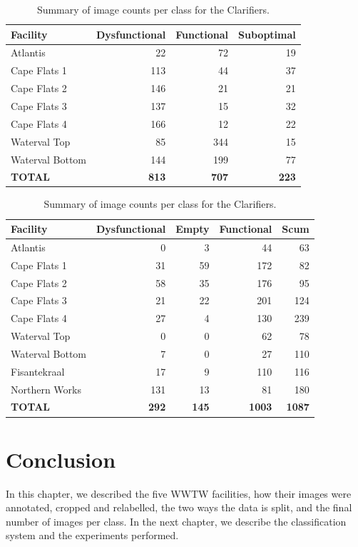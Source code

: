 \begin{table}[htbp]
    \centering
    \caption{Summary of image counts per class for the Aerobic Zones.}
    \label{tab:aerobic_summary}
    \begin{tabular}{l rrr}
        \toprule
        \textbf{Facility} & \textbf{Dysfunctional} & \textbf{Functional} & \textbf{Suboptimal} \\
        \midrule
        Atlantis         & 22  & 72  & 19  \\
        Cape Flats 1     & 113 & 44  & 37  \\
        Cape Flats 2     & 146 & 21  & 21  \\
        Cape Flats 3     & 137 & 15  & 32  \\
        Cape Flats 4     & 166 & 12  & 22  \\
        Waterval Top     & 85  & 344 & 15  \\
        Waterval Bottom  & 144 & 199 & 77  \\
        \midrule
        \textbf{TOTAL}   & \textbf{813} & \textbf{707} & \textbf{223} \\
        \bottomrule
    \end{tabular}
    
    \vspace{2.5em} 
    
    \caption{Summary of image counts per class for the Clarifiers.}
    \label{tab:clarifier_summary}
    \begin{tabular}{l rrrr}
        \toprule
        \textbf{Facility} & \textbf{Dysfunctional} & \textbf{Empty} & \textbf{Functional} & \textbf{Scum} \\
        \midrule
        Atlantis         & 0   & 3   & 44   & 63  \\
        Cape Flats 1     & 31  & 59  & 172  & 82  \\
        Cape Flats 2     & 58  & 35  & 176  & 95  \\
        Cape Flats 3     & 21  & 22  & 201  & 124 \\
        Cape Flats 4     & 27  & 4   & 130  & 239 \\
        Waterval Top     & 0   & 0   & 62   & 78  \\
        Waterval Bottom  & 7   & 0   & 27   & 110 \\
        Fisantekraal     & 17  & 9   & 110  & 116 \\
        Northern Works   & 131 & 13  & 81   & 180 \\
        \midrule
        \textbf{TOTAL}   & \textbf{292} & \textbf{145} & \textbf{1003} & \textbf{1087} \\
        \bottomrule
    \end{tabular}
\end{table}
\section{Conclusion}\label{sec:dataset_conclusion}

In this chapter, we described the five WWTW facilities, how their images were annotated, cropped and relabelled, the two ways the data is split, and the final number of images per class. In the next chapter, we describe the classification system and the experiments performed.
